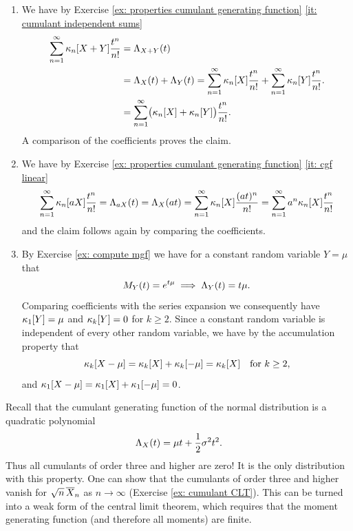 \begin{solution}
\begin{enumerate}[wide=0pt]
    \item[\ref{it: (cumulants) accumulate}]
    We have by Exercise \ref{ex: properties cumulant generating function} \ref{it: cumulant independent sums}
    \begin{align*}
        \sum_{n=1}^\infty \kappa_n[X+Y] \frac{t^n}{n!}
        &= \Lambda_{X+Y}(t)
        \\
        &= \Lambda_X(t) + \Lambda_Y(t)
        = \sum_{n=1}^\infty \kappa_n[X] \frac{t^n}{n!} + \sum_{n=1}^\infty \kappa_n[Y] \frac{t^n}{n!}.
        \\
        &= \sum_{n=1}^\infty \bigl(\kappa_n[X] + \kappa_n[Y]\bigr) \frac{t^n}{n!}.
    \end{align*}
    A comparison of the coefficients proves the claim.

    \item[\ref{it: (cumulants) homogeneity}]
    We have by Exercise \ref{ex: properties cumulant generating function} \ref{it: cgf linear}
    \[
        \sum_{n=1}^\infty \kappa_n[aX] \frac{t^n}{n!}
        = \Lambda_{aX}(t)
        = \Lambda_X(at)
        = \sum_{n=1}^\infty \kappa_n[X] \frac{(at)^n}{n!}
        = \sum_{n=1}^\infty a^n \kappa_n[X] \frac{t^n}{n!}
    \]
    and the claim follows again by comparing the coefficients.

    \item[\ref{it: (cumulants) constant}] By Exercise \ref{ex: compute mgf} we have
    for a constant random variable \(Y=\mu\) that
    \[
        M_Y(t) = e^{t \mu} \implies \Lambda_Y(t) = t \mu.
    \]
    Comparing coefficients with the series expansion we consequently have
    \(\kappa_1[Y] = \mu\) and \(\kappa_k[Y] = 0\) for \(k \ge 2\).
    Since a constant random variable is independent of every other random variable,
    we have by the accumulation property that
    \[
        \kappa_k[X-\mu]
        = \kappa_k[X] + \kappa_k[-\mu]
        = \kappa_k[X]
        \quad\text{for } k \ge 2,
    \]
    and \(\kappa_1[X-\mu] = \kappa_1[X] + \kappa_1[-\mu] = 0\).
    \qedhere
    \end{enumerate}
\end{solution}

\begin{remark}
    Recall that the cumulant generating function of the 
    normal distribution is a quadratic polynomial
    \[
        \Lambda_X(t) = \mu t + \frac12 \sigma^2 t^2.
    \]
    Thus all cumulants of order three and higher are zero! It is the only
    distribution with this property. One can show that the cumulants of order
    three and higher vanish for \(\sqrt{n}\, \overline{X}_n\) as \(n\to\infty\)
    (Exercise \ref{ex: cumulant CLT}). This can be turned into a weak
    form of the central limit theorem, which requires that the moment generating
    function (and therefore all moments) are finite.
\end{remark}

